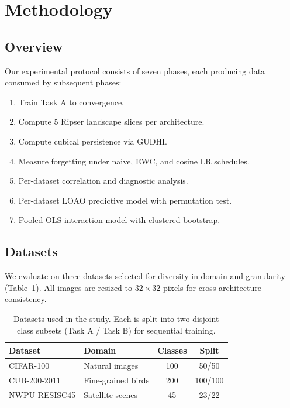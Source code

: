 \documentclass[10pt,twocolumn]{article}
\begin{document}
\section{Methodology}
\label{sec:method}

\subsection{Overview}

Our experimental protocol consists of seven phases, each producing data consumed by subsequent phases:
\begin{enumerate}
    \item[\textbf{P1.}] Train Task A to convergence.
    \item[\textbf{P2.}] Compute 5 Ripser landscape slices per architecture.
    \item[\textbf{P2c.}] Compute cubical persistence via GUDHI.
    \item[\textbf{P3.}] Measure forgetting under naive, EWC, and cosine LR schedules.
    \item[\textbf{P4.}] Per-dataset correlation and diagnostic analysis.
    \item[\textbf{P5.}] Per-dataset LOAO predictive model with permutation test.
    \item[\textbf{P6.}] Pooled OLS interaction model with clustered bootstrap.
\end{enumerate}

\subsection{Datasets}

We evaluate on three datasets selected for diversity in domain and granularity (Table~\ref{tab:datasets}). All images are resized to $32 \times 32$ pixels for cross-architecture consistency.

\begin{table}[t]
\centering
\caption{Datasets used in the study. Each is split into two disjoint class subsets (Task A / Task B) for sequential training.}
\label{tab:datasets}
\small
\setlength{\tabcolsep}{3pt}
\begin{tabular}{@{}llcc@{}}
\toprule
Dataset & Domain & Classes & Split \\
\midrule
CIFAR-100 & Natural images & 100 & 50/50 \\
CUB-200-2011 & Fine-grained birds & 200 & 100/100 \\
NWPU-RESISC45 & Satellite scenes & 45 & 23/22 \\
\bottomrule
\end{tabular}
\end{table}
\end{document}
